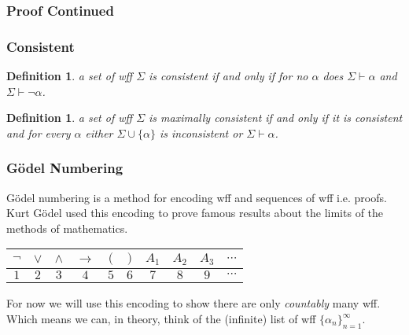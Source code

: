 \documentclass{beamer}
\theoremstyle{indentDefn} \newtheorem{defn}[]{Definition}
\begin{document}
\begin{frame}
	\frametitle{Proof Continued}
	
\end{frame}


\begin{frame}
	\frametitle{Consistent}
	
	\begin{defn} a set of wff $\Sigma$ is consistent if and only if for no $\alpha$ does $\Sigma \vdash \alpha$ and $\Sigma \vdash \lnot\alpha$. \end{defn}
	
	\vspace{0.5cm}
	
	\begin{defn} a set of wff $\Sigma$ is maximally consistent if and only if it is consistent and for every $\alpha$ either $\Sigma \cup \{\alpha\}$ is inconsistent or $\Sigma \vdash \alpha$.\end{defn} 
	
	\vspace{0.5cm} 

\end{frame}

\begin{frame}
	\frametitle{G\"{o}del Numbering}
	
	G\"{o}del numbering is a method for encoding wff and sequences of wff i.e. proofs. Kurt G\"{o}del used this encoding to prove famous results about the limits of the methods of mathematics. 
	
	\begin{center}
		\begin{tabular}{ c c c c c c c c c c }
			$\lnot$ & $\lor$ & $\land$ & $\to$ & $($ & $)$ & $A_{1}$ & $A_{2}$ & $A_{3}$ & $\cdots$ \\
			\hline
			$1$ & $2$ & $3$ & $4$ & $5$ & $6$ & $7$ & $8$ & $9$ & $\cdots$ 
		\end{tabular}
	\end{center}

	For now we will use this encoding to show there are only \textit{countably} many wff. Which means we can, in theory, think of the (infinite) list of wff $\{\alpha_{n}\}_{n=1}^{\infty}$.
	
	\vspace{4cm}
	
\end{frame}
\end{document}
